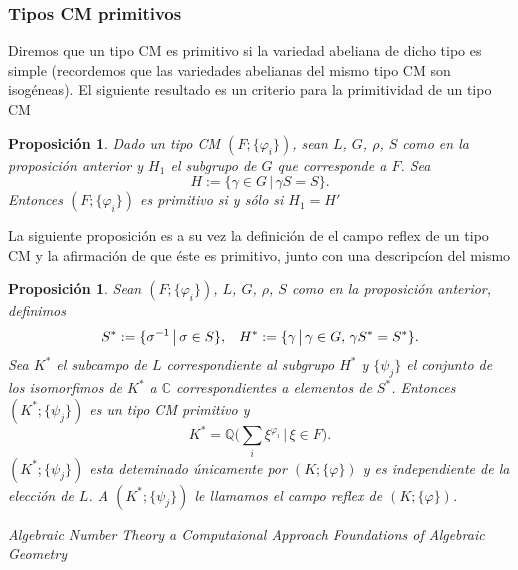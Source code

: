 \documentclass[letterpaper]{report}
\newtheorem{prop}[teorema]{Proposici\'on}
\newcommand{\rac}{\ensuremath{ \mathbb Q }}
\newcommand{\co}{\ensuremath{\mathbb C }}
\begin{document}
\subsubsection{Tipos CM primitivos} 
\noindent Diremos que un tipo CM es primitivo si la variedad abeliana de dicho tipo es simple (recordemos que las variedades abelianas del mismo tipo CM son isogéneas). El siguiente resultado es un criterio para la primitividad de un tipo CM
\begin{prop}
Dado un tipo CM $(F;\lbrace\varphi_i\rbrace)$, sean $L$, $G$, $\rho$, $S$ como en la proposición anterior y $H_1$ el subgrupo de $G$ que corresponde a $F$. Sea
$$H:=\lbrace\gamma\in G\,\big\vert\,\gamma S=S\rbrace.$$
\noindent Entonces $(F;\lbrace\varphi_i\rbrace)$ es primitivo si y sólo si $H_1=H'$
\end{prop} 
La siguiente proposición es a su vez la definición de el campo reflex de un tipo CM y la afirmación de que éste es primitivo, junto con una descripcíon del mismo
\begin{prop}
Sean $(F;\lbrace\varphi_i\rbrace)$, $L$, $G$, $\rho$, $S$ como en la proposición anterior, definimos
\begin{equation}
	S^*:=\lbrace\sigma^{-1}\,\big\vert\,\sigma\in S\rbrace,\hspace{0.3cm}
	H^*:=\lbrace\gamma\,\big\vert\,\gamma\in G,\,\gamma S^*=S^*\rbrace.
\end{equation}
\noindent Sea $K^*$ el subcampo de $L$ correspondiente al subgrupo $H^*$ y $\lbrace\psi_j\rbrace$ el conjunto de los isomorfimos de $K^*$ a $\co$ correspondientes a elementos de $S^*$. Entonces $(K^*;\lbrace\psi_j\rbrace)$ es un tipo CM primitivo y
\begin{equation}
	K^*=\rac\Big(\sum_{i}\xi^{\varphi_i}\,\vert\,\xi\in F\Big).
\end{equation}
\noindent $(K^*;\lbrace\psi_j\rbrace)$ esta deteminado únicamente por $(K;\lbrace\varphi\rbrace)$ y es independiente de la elección de $L$. A $(K^*;\lbrace\psi_j\rbrace)$ le llamamos el campo reflex de $(K;\lbrace\varphi\rbrace)$.
\end{prop}
\begin{thebibliography}{99}
 {\it Algebraic Number Theory a Computaional Approach}
 {\it Foundations of Algebraic Geometry}
\end{thebibliography}
\end{document}
